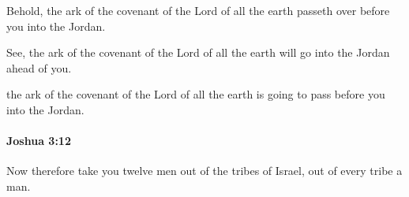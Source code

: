 			\begin{versebox}
					\item[BHS] 
					\item[ASV] Behold, the ark of the covenant of the Lord of all the earth passeth over before you into the Jordan.
					\item[NIV] See, the ark of the covenant of the Lord of all the earth will go into the Jordan ahead of you.
					\item[NRSV] the ark of the covenant of the Lord of all the earth is going to pass before you into the Jordan.
			\end{versebox}

		\paragraph{Joshua 3:12} %
			\label{JOSHUA-3-12}

			Now therefore take you twelve men out of the tribes of Israel, out of every tribe a man.

